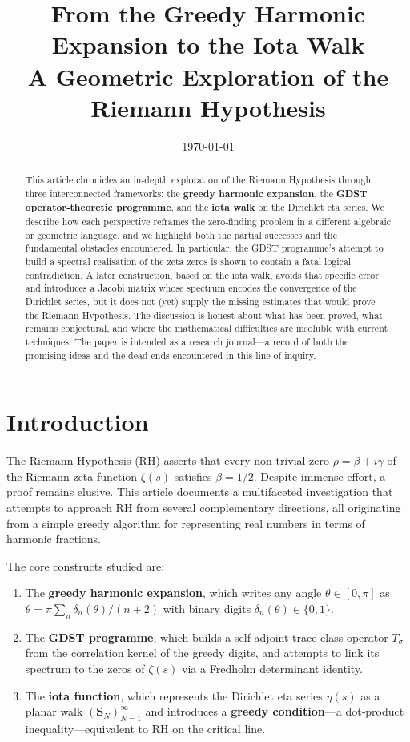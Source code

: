 \documentclass[11pt,a4paper]{article}
\title{\bf From the Greedy Harmonic Expansion to the Iota Walk\\
A Geometric Exploration of the Riemann Hypothesis}
\author{}
\date{\today}
\begin{document}
\maketitle

\begin{abstract}
This article chronicles an in‑depth exploration of the Riemann Hypothesis through three interconnected frameworks: the \textbf{greedy harmonic expansion}, the \textbf{GDST operator‑theoretic programme}, and the \textbf{iota walk} on the Dirichlet eta series.  We describe how each perspective reframes the zero‑finding problem in a different algebraic or geometric language, and we highlight both the partial successes and the fundamental obstacles encountered.  In particular, the GDST programme’s attempt to build a spectral realisation of the zeta zeros is shown to contain a fatal logical contradiction.  A later construction, based on the iota walk, avoids that specific error and introduces a Jacobi matrix whose spectrum encodes the convergence of the Dirichlet series, but it does not (yet) supply the missing estimates that would prove the Riemann Hypothesis.  The discussion is honest about what has been proved, what remains conjectural, and where the mathematical difficulties are insoluble with current techniques.  The paper is intended as a research journal—a record of both the promising ideas and the dead ends encountered in this line of inquiry.
\end{abstract}

\section{Introduction}
The Riemann Hypothesis (RH) asserts that every non‑trivial zero \(\rho = \beta + i\gamma\) of the Riemann zeta function \(\zeta(s)\) satisfies \(\beta = 1/2\).  Despite immense effort, a proof remains elusive.  This article documents a multifaceted investigation that attempts to approach RH from several complementary directions, all originating from a simple greedy algorithm for representing real numbers in terms of harmonic fractions.

The core constructs studied are:

\begin{enumerate}[nosep]
	\item The \textbf{greedy harmonic expansion}, which writes any angle \(\theta\in[0,\pi]\) as \(\theta = \pi\sum_{n} \delta_n(\theta)/(n+2)\) with binary digits \(\delta_n(\theta)\in\{0,1\}\).
	\item The \textbf{GDST programme}, which builds a self‑adjoint trace‑class operator \(T_\sigma\) from the correlation kernel of the greedy digits, and attempts to link its spectrum to the zeros of \(\zeta(s)\) via a Fredholm determinant identity.
	\item The \textbf{iota function}, which represents the Dirichlet eta series \(\eta(s)\) as a planar walk \(( \mathbf{S}_N )_{N=1}^\infty\) and introduces a \textbf{greedy condition}—a dot‑product inequality—equivalent to RH on the critical line.
\end{enumerate}
\end{document}
